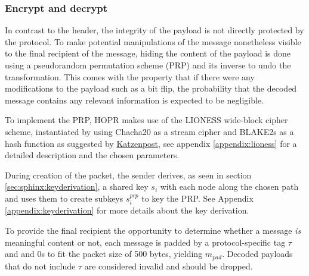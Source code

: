 \subsubsection{Encrypt and decrypt}

In contrast to the header, the integrity of the payload is not directly protected by the protocol. To make potential manipulations of the message nonetheless visible to the final recipient of the message, hiding the content of the payload is done using a pseudorandom permutation scheme (PRP) and its inverse to undo the transformation. This comes with the property that if there were any modifications to the payload such as a bit flip, the probability that the decoded message contains any relevant information is expected to be negligible.

To implement the PRP, HOPR makes use of the LIONESS \cite{lionesspaper} wide-block cipher scheme, instantiated by using Chacha20 as a stream cipher and BLAKE2s as a hash function as suggested by \href{https://katzenpost.mixnetworks.org/docs/specs/lioness.html}{Katzenpost}, see appendix \ref{appendix:lioness} for a detailed description and the chosen parameters.

During creation of the packet, the sender derives, as seen in section \ref{sec:sphinx:keyderivation}, a shared key $s_i$ with each node along the chosen path and uses them to create subkeys $s_i^{prp}$ to key the PRP. See Appendix \ref{appendix:keyderivation} for more details about the key derivation.

To provide the final recipient the opportunity to determine whether a message \textit{is} meaningful content or not, each message is padded by a protocol-specific tag $\tau$ and and 0s to fit the packet size of 500 bytes, yielding $m_{pad}$. Decoded payloads that do not include $\tau$ are considered invalid and should be dropped.

